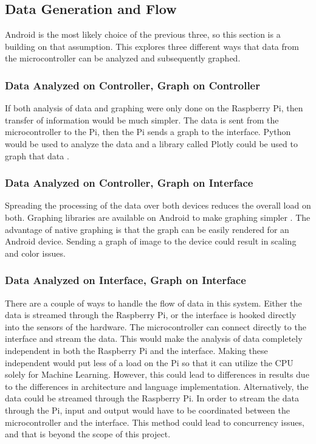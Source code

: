 \documentclass[draftclsnofoot,onecolumn,letterpaper,10pt]{IEEEtran}
\begin{document}
\subsection{Data Generation and Flow}
Android is the most likely choice of the previous three, so this section is a building on that assumption.
This explores three different ways that data from the microcontroller can be analyzed and subsequently graphed.

\subsubsection{Data Analyzed on Controller, Graph on Controller}
If both analysis of data and graphing were only done on the Raspberry Pi, then transfer of information would be much simpler.
The data is sent from the microcontroller to the Pi, then the Pi sends a graph to the interface.
Python would be used to analyze the data and a library called Plotly could be used to graph that data \cite{Plotly}.

\subsubsection{Data Analyzed on Controller, Graph on Interface}
Spreading the processing of the data over both devices reduces the overall load on both.
Graphing libraries are available on Android to make graphing simpler \cite{Graphview}.
The advantage of native graphing is that the graph can be easily rendered for an Android device.
Sending a graph of image to the device could result in scaling and color issues.

\subsubsection{Data Analyzed on Interface, Graph on Interface}
There are a couple of ways to handle the flow of data in this system.
Either the data is streamed through the Raspberry  Pi, or the interface is hooked directly into the sensors of the hardware.
The microcontroller can connect directly to the interface and stream the data.
This would make the analysis of data completely independent in both the Raspberry Pi and the interface.
Making these independent would put less of a load on the Pi so that it can utilize the CPU solely for Machine Learning.
However, this could lead to differences in results due to the differences in architecture and language implementation.
Alternatively, the data could be streamed through the Raspberry Pi.
In order to stream the data through the Pi, input and output would have to be coordinated between the microcontroller and the interface.
This method could lead to concurrency issues, and that is beyond the scope of this project.
\end{document}
